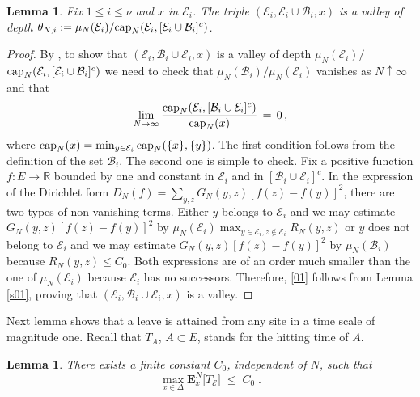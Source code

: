 \documentclass[reqno]{amsart}
\newtheorem{lemma}[theorem]{Lemma}
\begin{document}
\begin{lemma}
\label{s02}
Fix $1\le i\le \nu$ and $x$ in ${{\mathcal E}}_i$.  The triple $({{\mathcal E}}_i, {{\mathcal E}}_i \cup {{\mathcal B}}_i, x)$ is a valley of depth $\theta_{N,i} := \mu_N({{\mathcal E}}_i)/{{\rm cap}}_N({{\mathcal E}}_i , [{{\mathcal E}}_i \cup {{\mathcal B}}_i]^c)$.
\end{lemma}

\begin{proof}
By \cite[Theorem 2.6]{bl2}, to show that $({{\mathcal E}}_i, {{\mathcal B}}_i \cup {{\mathcal E}}_i, x)$ is a valley of depth $\mu_N({{\mathcal E}}_i)/$ ${{\rm cap}}_N({{\mathcal E}}_i , [{{\mathcal E}}_i \cup {{\mathcal B}}_i]^c)$ we need to check that $\mu_N({{\mathcal B}}_i)/\mu_N({{\mathcal E}}_i)$ vanishes as $N\uparrow\infty$ and that
\begin{equation}
\label{01}
\lim_{N\to\infty} \frac{{{\rm cap}}_N({{\mathcal E}}_i, [{{\mathcal B}}_i\cup {{\mathcal E}}_i]^c)}
{{{\rm cap}}_N(x)}\,=\,0\, ,
\end{equation}
where ${{\rm cap}}_N(x) = \min_{y\in {{\mathcal E}}_i} {{\rm cap}}_N(\{x\}, \{y\})$.  The
first condition follows from the definition of the set ${{\mathcal B}}_i$.  The
second one is simple to check. Fix a positive function $f: E \to {{\mathbb R}}$ bounded by one and constant in ${{\mathcal E}}_i$ and in $[{{\mathcal B}}_i\cup {{\mathcal E}}_i]^c$. In the expression of the Dirichlet form $D_N(f) =
\sum_{y,z} G_N(y,z) [f(z)-f(y)]^2$, there are two types of
non-vanishing terms.  Either $y$ belongs to ${{\mathcal E}}_i$ and we may
estimate $G_N(y,z) [f(z)-f(y)]^2$ by $\mu_N({{\mathcal E}}_i) \max_{y\in {{\mathcal E}}_i, z\not \in {{\mathcal E}}_i} R_N(y,z)$ or $y$ does not belong to ${{\mathcal E}}_i$ and we may estimate $G_N(y,z) [f(z)-f(y)]^2$ by $\mu_N({{\mathcal B}}_i)$
because $R_N(y,z) \le C_0$. Both expressions are of an order much
smaller than the one of $\mu_N({{\mathcal E}}_i)$ because ${{\mathcal E}}_i$ has no
successors.  Therefore, \eqref{01} follows from Lemma \ref{s01},
proving that $({{\mathcal E}}_i, {{\mathcal B}}_i \cup {{\mathcal E}}_i, x)$ is a valley.
\end{proof}

Next lemma shows that a leave is attained from any site in a time
scale of magnitude one. Recall that $T_A$, $A\subset E$, stands for
the hitting time of $A$. 

\begin{lemma}
\label{s05}
There exists a finite constant $C_0$, independent of $N$, such that  
\begin{equation*}
\max_{x \in \Delta} {{\mathbf E}}^N_x \big[ T_{{{\mathcal E}}} \big]
\;\le\; C_0\;.
\end{equation*}
\end{lemma}
\end{document}
